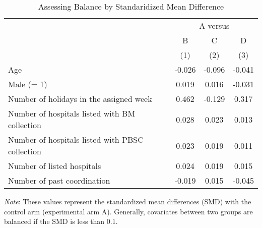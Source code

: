 \documentclass[12pt, a4paper]{article}
\begin{document}
\begin{table}[H]

\caption{\label{tab:smd-balance}Assessing Balance by Standaridized Mean Difference}
\centering
\fontsize{8}{10}\selectfont
\begin{threeparttable}
\begin{tabular}[t]{lccc}
\toprule
\multicolumn{1}{c}{ } & \multicolumn{3}{c}{A versus} \\
\cmidrule(l{3pt}r{3pt}){2-4}
\multicolumn{1}{c}{ } & \multicolumn{1}{c}{B} & \multicolumn{1}{c}{C} & \multicolumn{1}{c}{D} \\
\cmidrule(l{3pt}r{3pt}){2-2} \cmidrule(l{3pt}r{3pt}){3-3} \cmidrule(l{3pt}r{3pt}){4-4}
 & (1) & (2) & (3)\\
\midrule
Age & -0.026 & -0.096 & -0.041\\
Male (= 1) & 0.019 & 0.016 & -0.031\\
Number of holidays in the assigned week & 0.462 & -0.129 & 0.317\\
Number of hospitals listed with BM collection & 0.028 & 0.023 & 0.013\\
Number of hospitals listed with PBSC collection & 0.023 & 0.019 & 0.011\\
Number of listed hospitals & 0.024 & 0.019 & 0.015\\
Number of past coordination & -0.019 & 0.015 & -0.045\\
\bottomrule
\end{tabular}
\begin{tablenotes}
\item \emph{Note}: These values represent the standardized mean differences (SMD) with the control arm (experimental arm A). Generally, covariates between two groups are balanced if the SMD is less than $0.1$.
\end{tablenotes}
\end{threeparttable}
\end{table}
\end{document}
